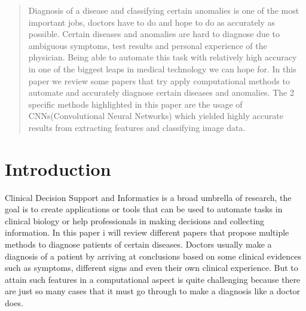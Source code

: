 \documentclass[conference]{IEEEtran}
\begin{document}
\begin{abstract}
Diagnosis of a disease and classifying certain anomalies is one of the most important jobs, doctors have to do and hope to do as accurately as possible. Certain diseases and anomalies are hard to diagnose due to ambiguous symptoms, test results and personal experience of the physician. Being able to automate this task with relatively high accuracy in one of the biggest leaps in medical technology we can hope for. In this paper we review some papers that try apply computational methods to automate and accurately diagnose certain diseases and anomalies. The 2 specific methods highlighted in this paper are the usage of CNNs(Convolutional Neural Networks) which yielded highly accurate results from extracting features and classifying image data.
\end{abstract}





%
\IEEEpeerreviewmaketitle



\section{Introduction}

Clinical Decision Support and Informatics is a broad umbrella of research, the goal is to create  applications or tools that can be used to automate tasks in clinical biology or help professionals in making decisions and collecting information. In this paper i will review different papers that propose multiple methods to diagnose patients of certain diseases. 
Doctors usually make a diagnosis of a patient by arriving at conclusions based on some clinical evidences such as symptoms, different signs and even their own clinical experience. But to attain such features in a computational aspect is quite challenging because there are just so many cases that it must go through to make a diagnosis like a doctor does.
\end{document}
